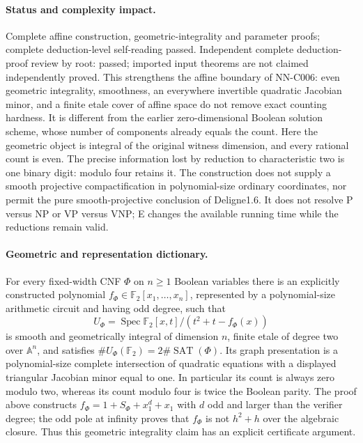 \paragraph{Status and complexity impact.}
Complete affine construction, geometric-integrality and parameter proofs; complete deduction-level self-reading passed. Independent complete deduction-proof review by root: passed; imported input theorems are not claimed independently proved. This strengthens the affine boundary of NN-C006: even geometric integrality, smoothness, an everywhere invertible quadratic Jacobian minor, and a finite etale cover of affine space do not remove exact counting hardness. It is different from the earlier zero-dimensional Boolean solution scheme, whose number of components already equals the count. Here the geometric object is integral of the original witness dimension, and every rational count is even. The precise information lost by reduction to characteristic two is one binary digit: modulo four retains it. The construction does not supply a smooth projective compactification in polynomial-size ordinary coordinates, nor permit the pure smooth-projective conclusion of Deligne1.6. It does not resolve P versus NP or VP versus VNP; E changes the available running time while the reductions remain valid.

\paragraph{Geometric and representation dictionary.}
For every fixed-width CNF $\Phi$ on $n\geq1$ Boolean variables there is an explicitly constructed polynomial $f_\Phi\in\mathbb F_2[x_1,\ldots,x_n]$, represented by a polynomial-size arithmetic circuit and having odd degree, such that
\[
 U_\Phi=\operatorname{Spec}\mathbb F_2[x,t]/(t^2+t-f_\Phi(x))
\]
is smooth and geometrically integral of dimension $n$, finite etale of degree two over $\mathbb A^n$, and satisfies $\#U_\Phi(\mathbb F_2)=2\#\operatorname{SAT}(\Phi)$. Its graph presentation is a polynomial-size complete intersection of quadratic equations with a displayed triangular Jacobian minor equal to one. In particular its count is always zero modulo two, whereas its count modulo four is twice the Boolean parity. The proof above constructs $f_\Phi=1+S_\Phi+x_1^d+x_1$ with $d$ odd and larger than the verifier degree; the odd pole at infinity proves that $f_\Phi$ is not $h^2+h$ over the algebraic closure. Thus this geometric integrality claim has an explicit certificate argument.

